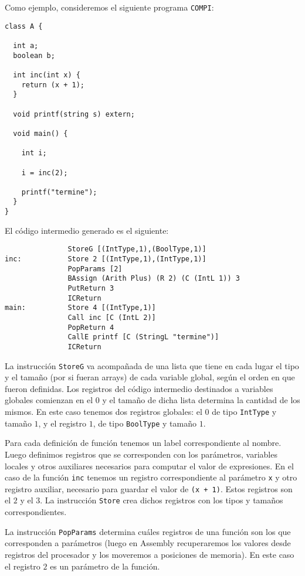 \documentclass[a4paper,10pt]{article}
\begin{document}
Como ejemplo, consideremos el siguiente programa \verb|COMPI|:

\begin{verbatim}
class A {

  int a;
  boolean b;

  int inc(int x) {
    return (x + 1);
  }
    
  void printf(string s) extern;
    
  void main() {

    int i;

    i = inc(2);

    printf("termine");
  }
}
\end{verbatim}

El código intermedio generado es el siguiente:

\begin{verbatim}
               StoreG [(IntType,1),(BoolType,1)]
inc:           Store 2 [(IntType,1),(IntType,1)]
               PopParams [2]
               BAssign (Arith Plus) (R 2) (C (IntL 1)) 3
               PutReturn 3
               ICReturn
main:          Store 4 [(IntType,1)]
               Call inc [C (IntL 2)]
               PopReturn 4
               CallE printf [C (StringL "termine")]
               ICReturn

\end{verbatim}

La instrucción \verb|StoreG| va acompañada de una lista que tiene en cada lugar el tipo y el tamaño (por si fueran arrays)
de cada variable global, según el orden en que fueron definidas. Los registros del código intermedio destinados a variables
globales comienzan en el $0$ y el tamaño de dicha lista determina la cantidad de los mismos. En este caso tenemos dos registros
globales: el $0$ de tipo \verb|IntType| y tamaño $1$, y el registro $1$, de tipo \verb|BoolType| y tamaño $1$.

Para cada definición de función tenemos un label correspondiente al nombre. Luego definimos registros que se corresponden con los parámetros,
variables locales y otros auxiliares necesarios para computar el valor de expresiones. En el caso de la función \verb|inc| tenemos un registro
correspondiente al parámetro \verb|x| y otro registro auxiliar, necesario para guardar el valor de \verb|(x + 1)|. Estos registros son el $2$ y el $3$.
La instrucción \verb|Store| crea dichos registros con los tipos y tamaños correspondientes.

La instrucción \verb|PopParams| determina cuáles registros de una función son los que corresponden a parámetros (luego en Assembly recuperaremos 
los valores desde registros del procesador y los moveremos a posiciones de memoria). En este caso el registro $2$ es un parámetro de la función.
\end{document}
